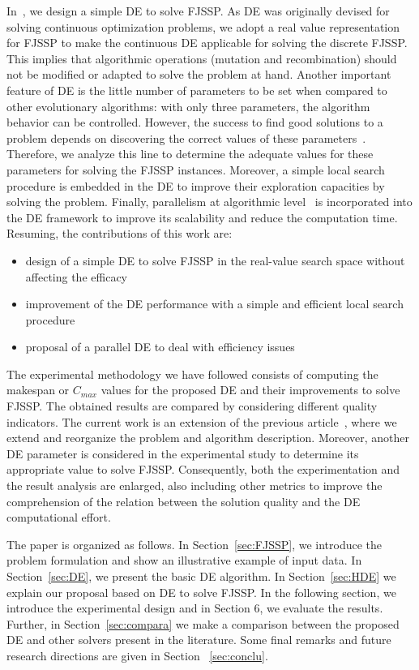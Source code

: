 In~\cite{morero2019}, we design a simple DE to solve FJSSP. As DE was originally devised for solving continuous optimization problems, we adopt a real value representation for FJSSP to make the continuous DE applicable for solving the discrete FJSSP. This implies that algorithmic operations (mutation and recombination) should not be modified or adapted to solve the problem at hand. Another important feature of DE is the little number of parameters to be set when compared to other evolutionary algorithms: with only three parameters, the algorithm behavior can be controlled. However, the success to find good solutions to a problem depends on discovering the correct values of these parameters~\cite{app8101945}. Therefore, we analyze this line to determine the adequate values for these parameters for solving the FJSSP instances. Moreover, a simple local search procedure is embedded in the DE to improve their exploration capacities by solving the problem. Finally, parallelism at algorithmic level~\cite{Talbi} is incorporated into the DE framework to improve its scalability and reduce the computation time.  Resuming, the contributions of this work are:
\begin{itemize}
\item design of a simple DE to solve FJSSP in the real-value search space without affecting the efficacy
\item improvement of the DE performance with a simple and efficient local search procedure
\item proposal of a parallel DE to deal with efficiency issues
\end{itemize}

The experimental methodology we have followed consists of computing the makespan or $C_{max}$ values for the proposed DE and their improvements to solve FJSSP. The obtained results are compared by considering different quality indicators. The current work is an extension of the previous article~\cite{morero2019}, where we extend and reorganize the problem and algorithm description. Moreover, another DE parameter is considered in the experimental study to determine its appropriate value to solve FJSSP. Consequently, both the experimentation and the result analysis are enlarged, also including other metrics to improve the comprehension of the relation between the solution quality and the DE computational effort.

The paper is organized as follows. In Section~\ref{sec:FJSSP}, we introduce the problem formulation and show an illustrative example of input data. In Section~\ref{sec:DE}, we present the basic DE algorithm. In Section~\ref{sec:HDE} we explain our proposal based on DE to solve FJSSP. In the following section, we introduce the experimental design and in Section 6, we evaluate the results. Further, in Section~\ref{sec:compara} we make a comparison between the proposed DE and other solvers present in the literature. Some final remarks and future research directions are given in Section ~\ref{sec:conclu}.
